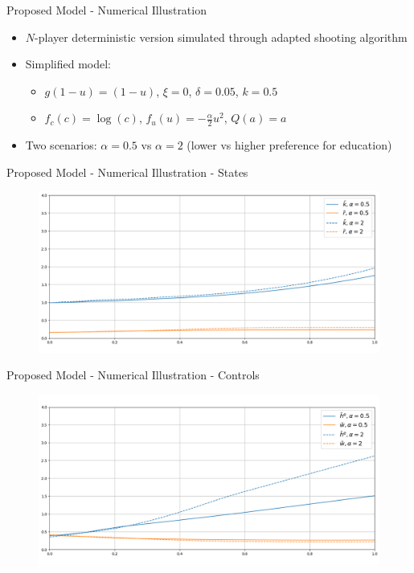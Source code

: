 \documentclass{beamer}
\begin{document}
\begin{frame}{Proposed Model - Numerical Illustration}
\begin{itemize}
    \item $N$-player deterministic version simulated through adapted shooting algorithm
    \item Simplified model:
    \begin{itemize}
        \item $g(1- u) = (1 - u)$, $\xi = 0$, $\delta = 0.05$, $k = 0.5$
        \item $f_c(c) = \log(c)$, $f_u(u) = -\frac{\alpha}{2} u^2$, $Q(a) = a$
    \end{itemize}
    \item Two scenarios: $\alpha = 0.5$ vs $\alpha = 2$ (lower vs higher preference for education)
\end{itemize}
\end{frame}

\begin{frame}{Proposed Model - Numerical Illustration - States}

\begin{figure}[h!]
\includegraphics[width=\textwidth]{presentation/model_simulations/simulations_mfg_states.png}
\end{figure}
\end{frame}


\begin{frame}{Proposed Model - Numerical Illustration - Controls}
\begin{figure}[h!]
\includegraphics[width=\textwidth]{presentation/model_simulations/simulations_mfg_controls.png}
\end{figure}

\end{frame}
\end{document}
